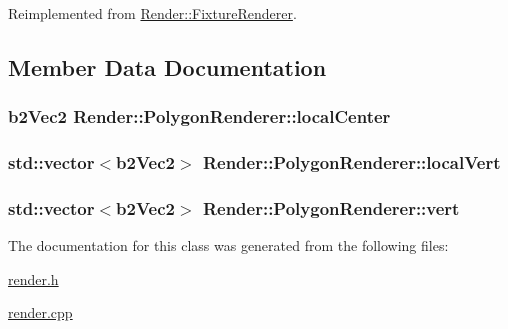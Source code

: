 Reimplemented from \hyperlink{classRender_1_1FixtureRenderer_a20f23477aa8cc646f2d18b0165666e3b}{Render\+::\+Fixture\+Renderer}.



\subsection{Member Data Documentation}
\hypertarget{classRender_1_1PolygonRenderer_a9f2dc2e4bff2308cb37b7573307cb4c5}{}
\subsubsection[{local\+Center}]{\setlength{\rightskip}{0pt plus 5cm}b2\+Vec2 Render\+::\+Polygon\+Renderer\+::local\+Center\hspace{0.3cm}{\ttfamily [private]}}\label{classRender_1_1PolygonRenderer_a9f2dc2e4bff2308cb37b7573307cb4c5}
\hypertarget{classRender_1_1PolygonRenderer_ad7a634f5ab472fc121698f8e5a288f31}{}
\subsubsection[{local\+Vert}]{\setlength{\rightskip}{0pt plus 5cm}std\+::vector$<$b2\+Vec2$>$ Render\+::\+Polygon\+Renderer\+::local\+Vert\hspace{0.3cm}{\ttfamily [private]}}\label{classRender_1_1PolygonRenderer_ad7a634f5ab472fc121698f8e5a288f31}
\hypertarget{classRender_1_1PolygonRenderer_ab4986f5dd990859f59e9b37b52dd352d}{}
\subsubsection[{vert}]{\setlength{\rightskip}{0pt plus 5cm}std\+::vector$<$b2\+Vec2$>$ Render\+::\+Polygon\+Renderer\+::vert\hspace{0.3cm}{\ttfamily [private]}}\label{classRender_1_1PolygonRenderer_ab4986f5dd990859f59e9b37b52dd352d}


The documentation for this class was generated from the following files\+:\begin{DoxyCompactItemize}
\item 
\hyperlink{render_8h}{render.\+h}\item 
\hyperlink{render_8cpp}{render.\+cpp}\end{DoxyCompactItemize}

